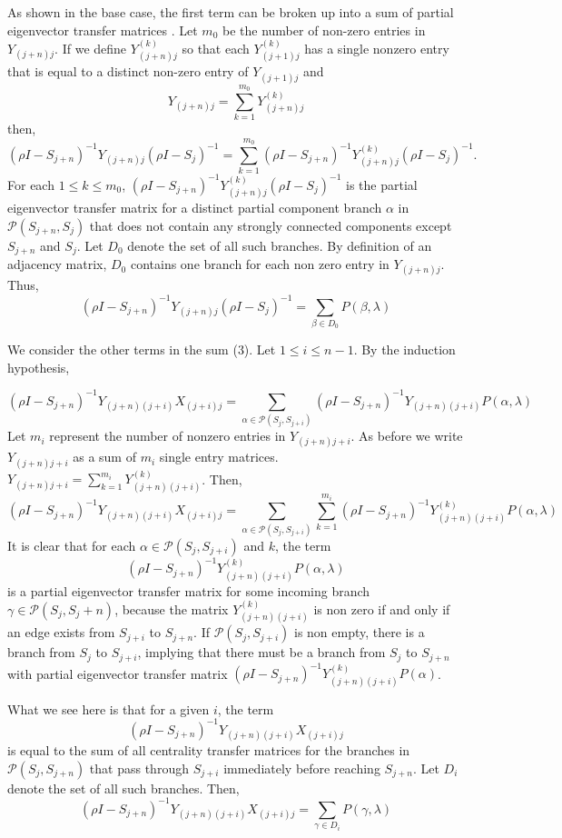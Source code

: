 \documentclass{paper}
\begin{document}
As shown in the base case, the first term can be broken up into a sum of partial eigenvector transfer matrices . Let $m_0$ be the number of non-zero entries in $Y_{(j+n)j}.$ If we define $Y_{(j+n)j}^{(k)}$ so that each $Y_{(j+1)j}^{(k)}$ has a single nonzero entry that is equal to a distinct non-zero entry of $Y_{(j+1)j}$ and
\[Y_{(j+n)j} = \sum_{k=1}^{m_0} Y_{(j+n)j}^{(k)}\]
then,
\[
(\rho I - S_{j+n})^{-1} Y_{(j+n)j}(\rho I - S_j)^{-1} = \sum_{k=1}^{m_0}(\rho I - S_{j+n})^{-1} Y_{(j+n)j}^{(k)}(\rho I - S_j)^{-1}.
\]
For each $1 \leq k \leq m_0 $, $(\rho I - S_{j+n})^{-1} Y_{(j+n)j}^{(k)}(\rho I - S_j)^{-1}$ is the partial eigenvector transfer matrix for a distinct partial component branch $\alpha$ in $\mathcal{P}(S_{j+n},S_j)$ that does not contain any strongly connected components except $S_{j+n}$ and $S_j$. Let $D_0$ denote the set of all such branches. By definition of an adjacency matrix,  $D_0$ contains one branch for each non zero entry in $Y_{(j+n)j}$. Thus,
\begin{equation}
(\rho I - S_{j+n})^{-1} Y_{(j+n)j}(\rho I - S_j)^{-1} = \sum_{\beta \in D_0}P(\beta,\lambda)
\end{equation}

We consider the other terms in the sum (3). Let $1 \leq i \leq n-1$. By the induction hypothesis,

\[
(\rho I - S_{j+n})^{-1}Y_{(j+n)(j+i)}X_{(j+i)j} = \sum_{\alpha \in \mathcal{P}(S_j,S_{j+i})}(\rho I - S_{j+n})^{-1}Y_{(j+n)(j+i)} P(\alpha,\lambda )
\]
Let $m_i$ represent the number of nonzero entries in $Y_{(j+n)j+i}$. As before we write $Y_{(j+n)j+i}$ as a sum of $m_i$ single entry matrices.
$Y_{(j+n)j+i} = \sum_{k=1}^{m_i} Y_{(j+n)(j+i)}^{(k)}$. Then,
\[
(\rho I - S_{j+n})^{-1}Y_{(j+n)(j+i)}X_{(j+i)j} = \sum_{\alpha \in \mathcal{P}(S_j,S_{j+i})} \sum_{k=1}^{m_i}(\rho I - S_{j+n})^{-1}Y_{(j+n)(j+i)}^{(k)} P(\alpha,\lambda )
\]
It is clear that for each $\alpha \in \mathcal{P}(S_j,S_{j+i})$ and $k$, the term
\[
(\rho I - S_{j+n})^{-1}Y_{(j+n)(j+i)}^{(k)} P(\alpha,\lambda )
\]
is a partial eigenvector transfer matrix for some incoming branch $\gamma \in \mathcal{P}(S_j,S_j+n)$, because the matrix $Y_{(j+n)(j+i)}^{(k)}$ is non zero if and only if an edge exists from $S_{j+i}$ to $S_{j+n}$. If $\mathcal{P}(S_j,S_{j+i})$ is non empty, there is a branch from $S_j$ to $S_{j+i}$, implying that there must be a branch from $S_j$ to $S_{j+n}$ with partial eigenvector transfer matrix $(\rho I - S_{j+n})^{-1}Y_{(j+n)(j+i)}^{(k)} P(\alpha )$.


What we see here is that for a given $i$, the term \[(\rho I - S_{j+n})^{-1}Y_{(j+n)(j+i)}X_{(j+i)j} \] is equal to the sum of all centrality transfer matrices for the branches in $\mathcal{P}(S_j,S_{j+n})$ that pass through $S_{j+i}$ immediately before reaching $S_{j+n}$. Let $D_i$ denote the set of all such branches. Then,
\begin{equation}
(\rho I - S_{j+n})^{-1}Y_{(j+n)(j+i)}X_{(j+i)j} = \sum_{\gamma \in D_i} P(\gamma,\lambda)
\end{equation}
\end{document}
